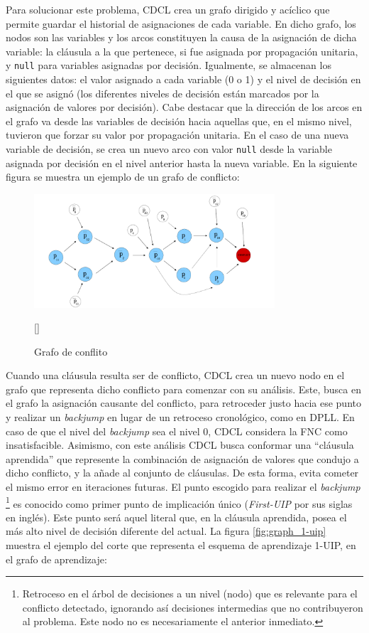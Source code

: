 Para solucionar este problema, CDCL crea un grafo dirigido y ac\'iclico que permite guardar el historial de asignaciones de cada variable. En dicho grafo, los nodos son las variables y los arcos constituyen la causa de la asignaci\'on de dicha variable: la cl\'ausula a la que pertenece, si fue asignada por propagaci\'on unitaria, y \texttt{null} para variables asignadas por decisi\'on. Igualmente, se almacenan los siguientes datos: el valor asignado a cada variable (0 o 1) y el nivel de decisi\'on en el que se asign\'o (los diferentes niveles de decisi\'on est\'an marcados por la asignaci\'on de valores por decisi\'on). Cabe destacar que la direcci\'on de los arcos en el grafo va desde las variables de decisi\'on hacia aquellas que, en el mismo nivel, tuvieron que forzar su valor por propagaci\'on unitaria. En el caso de una nueva variable de decisi\'on, se crea un nuevo arco con valor \texttt{null} desde la variable asignada por decisi\'on en el nivel anterior hasta la nueva variable. En la siguiente figura se muestra un ejemplo de un grafo de conflicto:

\begin{figure}[ht]
    \centering
    \includegraphics[width=0.8\textwidth]{Graphics/conflict_graph.png}
    \caption{Grafo de conflito}
    [\cite{oliveras2009dpll_cdcl}]
    \label{fig:conflict_graph}
\end{figure}

Cuando una cl\'ausula resulta ser de conflicto, CDCL crea un nuevo nodo en el grafo que representa dicho conflicto para comenzar con su an\'alisis. Este, busca en el grafo la asignaci\'on causante del conflicto, para retroceder justo hacia ese punto y realizar un \textit{backjump} en lugar de un retroceso cronol\'ogico, como en DPLL. En caso de que el nivel del \textit{backjump} sea el nivel 0, CDCL considera la FNC como insatisfacible. Asimismo, con este an\'alisis CDCL busca conformar una ``cl\'ausula aprendida'' que represente la combinaci\'on de asignaci\'on de valores que condujo a dicho conflicto, y la a\~nade al conjunto de cl\'ausulas. De esta forma, evita cometer el mismo error en iteraciones futuras. El punto escogido para realizar el \textit{backjump} \footnote{Retroceso en el \'arbol de decisiones a un nivel (nodo) que es relevante para el conflicto detectado, ignorando así decisiones intermedias que no contribuyeron al problema. Este nodo no es necesariamente el anterior inmediato.} es conocido como primer punto de implicaci\'on \'unico (\textit{First-UIP} por sus siglas en ingl\'es). Este punto ser\'a aquel literal que, en la cl\'ausula aprendida, posea el m\'as alto nivel de decisi\'on diferente del actual. La figura \ref{fig:graph_1-uip} muestra el ejemplo del corte que representa el esquema de aprendizaje 1-UIP, en el grafo de aprendizaje:

